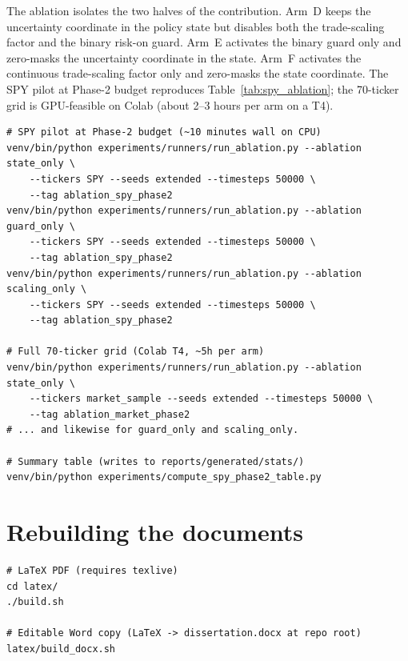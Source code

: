 The ablation isolates the two halves of the contribution. Arm~D keeps the uncertainty coordinate in the policy state but disables both the trade-scaling factor and the binary risk-on guard. Arm~E activates the binary guard only and zero-masks the uncertainty coordinate in the state. Arm~F activates the continuous trade-scaling factor only and zero-masks the state coordinate. The SPY pilot at Phase-2 budget reproduces Table~\ref{tab:spy_ablation}; the 70-ticker grid is GPU-feasible on Colab (about 2--3 hours per arm on a T4).

\begin{verbatim}
# SPY pilot at Phase-2 budget (~10 minutes wall on CPU)
venv/bin/python experiments/runners/run_ablation.py --ablation state_only \
    --tickers SPY --seeds extended --timesteps 50000 \
    --tag ablation_spy_phase2
venv/bin/python experiments/runners/run_ablation.py --ablation guard_only \
    --tickers SPY --seeds extended --timesteps 50000 \
    --tag ablation_spy_phase2
venv/bin/python experiments/runners/run_ablation.py --ablation scaling_only \
    --tickers SPY --seeds extended --timesteps 50000 \
    --tag ablation_spy_phase2

# Full 70-ticker grid (Colab T4, ~5h per arm)
venv/bin/python experiments/runners/run_ablation.py --ablation state_only \
    --tickers market_sample --seeds extended --timesteps 50000 \
    --tag ablation_market_phase2
# ... and likewise for guard_only and scaling_only.

# Summary table (writes to reports/generated/stats/)
venv/bin/python experiments/compute_spy_phase2_table.py
\end{verbatim}

\section{Rebuilding the documents}
\label{app:rebuild_documents}

\begin{verbatim}
# LaTeX PDF (requires texlive)
cd latex/
./build.sh

# Editable Word copy (LaTeX -> dissertation.docx at repo root)
latex/build_docx.sh
\end{verbatim}
